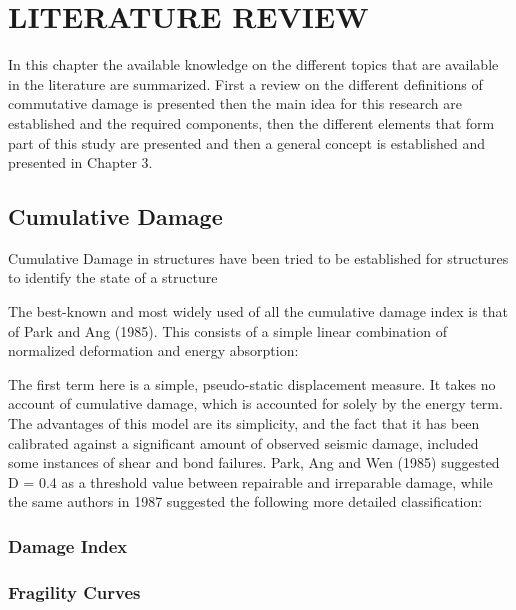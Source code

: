 \chapter{LITERATURE REVIEW}
\label{chap-two}
In this chapter the available knowledge on the different topics that are available in the literature are summarized. First a review on the different definitions of commutative damage is presented then the main idea for this research are established and the required components, then the different elements that form part of this study are presented and then a general concept is established and presented in Chapter 3.

\section{Cumulative Damage}

Cumulative Damage in structures have been tried to be established for structures to identify the state of a structure 

The best-known and most widely used of all the cumulative damage index is that of Park and Ang (1985). This consists of a simple linear combination of normalized deformation and energy absorption: 

The first term here is a simple, pseudo-static displacement measure. It takes no account of cumulative damage, which is accounted for solely by the energy term. The advantages of this model are its simplicity, and the fact that it has been calibrated against a significant amount of observed seismic damage, included some instances of shear and bond failures. Park, Ang and Wen (1985) suggested D = 0.4 as a threshold value between repairable and irreparable damage, while the same authors in 1987 suggested the following more detailed classification: 

\subsection{Damage Index}
\subsection{Fragility Curves}
